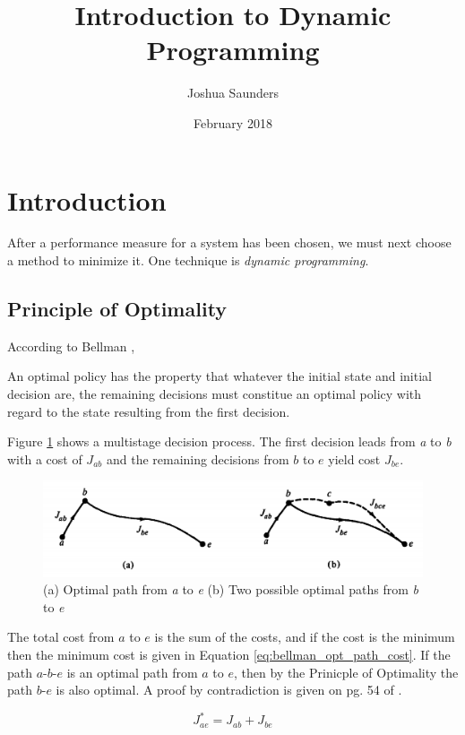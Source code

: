 \documentclass{article}
\title{Introduction to Dynamic Programming}
\author{Joshua Saunders}
\date{February 2018}
\begin{document}
\maketitle

\section{Introduction}

After a performance measure for a system has been chosen, we must next choose a
method to minimize it. One technique is \textit{dynamic programming}.

\subsection{Principle of Optimality}

According to Bellman \cite{bellman2015applied},

\begin{displayquote}
An optimal policy has the property that whatever the initial state and initial
decision are, the remaining decisions must constitue an optimal policy with
regard to the state resulting from the first decision.
\end{displayquote}

Figure \ref{fig:optimal_paths} shows a multistage decision process. The first
decision leads from \textit{a} to \textit{b} with a cost of $J_{ab}$ and the
remaining decisions from $b$ to $e$ yield cost $J_{be}$.

\begin{figure}[h]
    \begin{center}
        \includegraphics[scale=0.3]{optimality_principle_paths}
        \caption{
          (a) Optimal path from \textit{a} to \textit{e}
          (b) Two possible optimal paths from \textit{b} to \textit{e}
          \cite{kirkdover}
        }
        \label{fig:optimal_paths}
    \end{center}
\end{figure}

\noindent The total cost from $a$ to $e$ is the sum of the costs, and if the
cost is the minimum then the minimum cost is given in Equation
\ref{eq:bellman_opt_path_cost}. If the path $a$-$b$-$e$ is an optimal path from
$a$ to $e$, then by the Prinicple of Optimality the path $b$-$e$ is also
optimal. A proof by contradiction is given on pg. 54 of
\cite{bellman2015applied}.


\begin{equation} \label{eq:bellman_opt_path_cost}
  J_{ae}^* = J_{ab} + J_{be}
\end{equation}

\newpage


\end{document}
